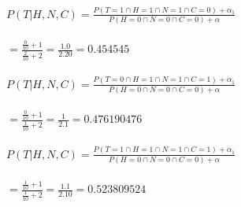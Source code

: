 \documentclass[a4paper]{article}
\begin{document}
\\
$P(T|H,N,C)=\frac{P(T=1 \cap  H=1 \cap  N=1 \cap  C=0) +\alpha_1}{P(H=0 \cap N=0 \cap C=0) +\alpha}$
\\
\\
$=\frac{\frac{0}{10}+1}{\frac{2}{10}+2}=\frac{1.0}{2.20}=0.454545$
\\
\\
$P(T|H,N,C)=\frac{P(T=0 \cap  H=1 \cap  N=1 \cap  C=1) +\alpha_1}{P(H=0 \cap N=0 \cap C=0) +\alpha}$
\\
\\
$=\frac{\frac{0}{10}+1}{\frac{1}{10}+2}=\frac{1}{2.1}=0.476190476$
\\
\\
$P(T|H,N,C)=\frac{P(T=1 \cap  H=1 \cap  N=1 \cap  C=1) +\alpha_1}{P(H=0 \cap N=0 \cap C=0) +\alpha}$
\\
\\
$=\frac{\frac{1}{10}+1}{\frac{1}{10}+2}=\frac{1.1}{2.10}=0.523809524$
\\
\\
\end{document}
